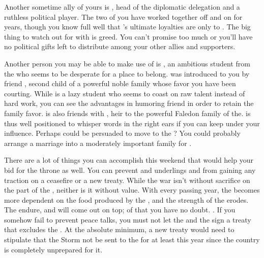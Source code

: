 \documentclass[char]{GL2020}
\begin{document}
Another sometime ally of yours is \cEvil{\full}, head of the \pFarm{} diplomatic delegation and a ruthless political player. The two of you have worked together off and on for years, though you know full well that \cEvil{}'s ultimate loyalties are only to \cEvil{\themself}. The big thing to watch out for with \cEvil{} is \cEvil{\their} greed. You can’t promise \cEvil{\them} too much or you’ll have no political gifts left to distribute among your other allies and supporters.

Another person you may be able to make use of is \cAmbition{\full}, an ambitious student from the \pTech{}who seems to be desperate for a place to belong. \cAmbition{} was introduced to you by \cAmbition{\their} friend \cChupStudent{\full}, second child of a powerful noble family whose favor you have been courting. While \cChupStudent{} is a lazy student who seems to coast on raw talent instead of hard work, you can see the advantages in humoring \cChupStudent{\their} friend in order to retain  the \cChupStudent{\formal} family favor. \cAmbition{} is also friends with \cHeir{\full}, heir to the powerful Faledon family of the\pTech{}. \cAmbition{} is thus well positioned to whisper words in the right ears if you can keep \cAmbition{\them} under your influence. Perhaps \cAmbition{\they} could be persuaded to move to the \pFarm{}? You could probably arrange a marriage into a moderately important family for \cAmbition{\them}.

There are a lot of things you can accomplish this weekend that would help your bid for the throne as well. You can prevent \cHeadDiplomat{\full} and \cHeadDiplomat{\their} underlings \cJuniorStatesman{} and \cChupLeader{} from gaining any traction on a ceasefire or a new treaty. While the war isn’t without sacrifice on the part of the \pFarm{}, neither is it without value. With every passing year, the \pTech{} becomes more dependent on the food produced by the \pFarm{}, and the strength of the \pShip{} erodes. The \pFarm{} endure, and will come out on top; of that you have no doubt. . If you somehow fail to prevent peace talks, you must not let the \pTech{} and the \pShip{} sign a treaty that excludes the \pFarm{}. At the absolute minimum, a new treaty would need to stipulate that the Storm not be sent to the \pFarm{} for at least this year since the country is completely unprepared for it. 
\end{document}
